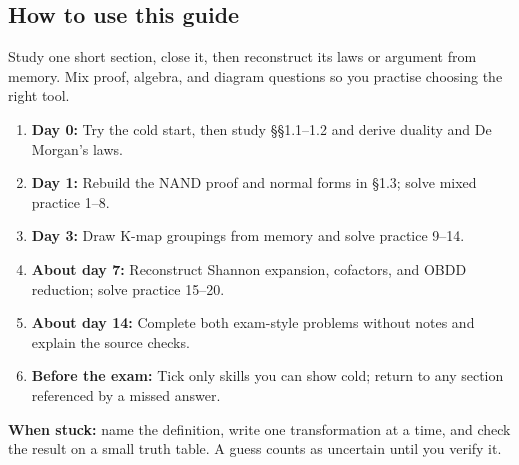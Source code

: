 \documentclass[11pt]{article}
\begin{document}
\begin{keepsection}
\section{How to use this guide}

Study one short section, close it, then reconstruct its laws or argument from memory. Mix proof, algebra, and diagram questions so you practise choosing the right tool.

\begin{enumerate}
\item \textbf{Day 0:} Try the cold start, then study §§1.1–1.2 and derive duality and De Morgan’s laws.
\item \textbf{Day 1:} Rebuild the NAND proof and normal forms in §1.3; solve mixed practice 1–8.
\item \textbf{Day 3:} Draw K-map groupings from memory and solve practice 9–14.
\item \textbf{About day 7:} Reconstruct Shannon expansion, cofactors, and OBDD reduction; solve practice 15–20.
\item \textbf{About day 14:} Complete both exam-style problems without notes and explain the source checks.
\item \textbf{Before the exam:} Tick only skills you can show cold; return to any section referenced by a missed answer.
\end{enumerate}

\begin{notebox}\textbf{When stuck:} name the definition, write one transformation at a time, and check the result on a small truth table. A guess counts as uncertain until you verify it.\end{notebox}
\end{keepsection}
\end{document}
